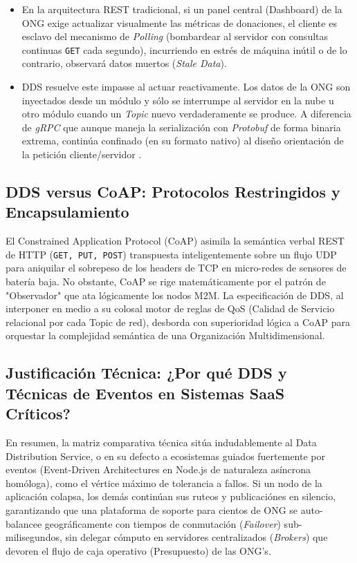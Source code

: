 \documentclass[11pt,a4paper,oneside]{report}
\begin{document}
\begin{itemize}
    \item En la arquitectura REST tradicional, si un panel central (Dashboard) de la ONG exige actualizar visualmente las m\'etricas de donaciones, el cliente es esclavo del mecanismo de \textit{Polling} (bombardear al servidor con consultas continuas \texttt{GET} cada segundo), incurriendo en estr\'es de m\'aquina in\'util o de lo contrario, observar\'a datos muertos (\textit{Stale Data}). 
    \item DDS resuelve este impasse al actuar reactivamente. Los datos de la ONG son inyectados desde un m\'odulo y s\'olo se interrumpe al servidor en la nube u otro m\'odulo cuando un \textit{Topic} nuevo verdaderamente se produce. A diferencia de \textit{gRPC} que aunque maneja la serializaci\'on con \textit{Protobuf} de forma binaria extrema, contin\'ua confinado (en su formato nativo) al dise\~no orientaci\'on de la petici\'on cliente/servidor \citep{profanter2019}.
\end{itemize}

\subsection{DDS versus CoAP: Protocolos Restringidos y Encapsulamiento}
El Constrained Application Protocol (CoAP) asimila la sem\'antica verbal REST de HTTP (\texttt{GET, PUT, POST}) transpuesta inteligentemente sobre un flujo UDP para aniquilar el sobrepeso de los headers de TCP en micro-redes de sensores de bater\'ia baja. No obstante, CoAP se rige matem\'aticamente por el patr\'on de "Observador" que ata l\'ogicamente los nodos M2M. La especificaci\'on de DDS, al interponer en medio a su colosal motor de reglas de QoS (Calidad de Servicio relacional por cada Topic de red), desborda con superioridad l\'ogica a CoAP para orquestar la complejidad sem\'antica de una Organizaci\'on Multidimensional.

\subsection{Justificaci\'on T\'ecnica: ¿Por qu\'e DDS y T\'ecnicas de Eventos en Sistemas SaaS Cr\'iticos?}
En resumen, la matriz comparativa t\'ecnica sit\'ua indudablemente al Data Distribution Service, o en su defecto a ecosistemas guiados fuertemente por eventos (Event-Driven Architectures en Node.js de naturaleza as\'incrona hom\'ologa), como el v\'ertice m\'aximo de tolerancia a fallos. Si un nodo de la aplicaci\'on colapsa, los dem\'as contin\'uan sus ruteos y publicaci\'ones en silencio, garantizando que una plataforma de soporte para cientos de ONG se auto-balancee geogr\'aficamente con tiempos de conmutaci\'on (\textit{Failover}) sub-milisegundos, sin delegar c\'omputo en servidores centralizados (\textit{Brokers}) que devoren el flujo de caja operativo (Presupuesto) de las ONG's.
\end{document}
